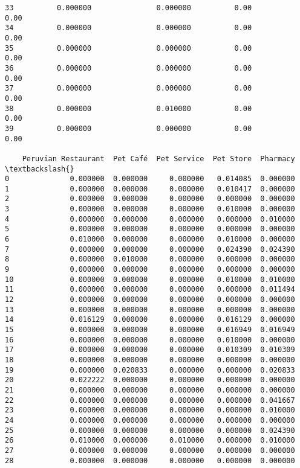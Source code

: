 \documentclass[11pt]{article}
\begin{document}
\begin{tcolorbox}[breakable, size=fbox, boxrule=.5pt, pad at break*=1mm, opacityfill=0]
\begin{Verbatim}[commandchars=\\\{\}]
33          0.000000               0.000000          0.00                0.00
34          0.000000               0.000000          0.00                0.00
35          0.000000               0.000000          0.00                0.00
36          0.000000               0.000000          0.00                0.00
37          0.000000               0.000000          0.00                0.00
38          0.000000               0.010000          0.00                0.00
39          0.000000               0.000000          0.00                0.00

    Peruvian Restaurant  Pet Café  Pet Service  Pet Store  Pharmacy  \textbackslash{}
0              0.000000  0.000000     0.000000   0.014085  0.000000
1              0.000000  0.000000     0.000000   0.010417  0.000000
2              0.000000  0.000000     0.000000   0.000000  0.000000
3              0.000000  0.000000     0.000000   0.010000  0.000000
4              0.000000  0.000000     0.000000   0.000000  0.010000
5              0.000000  0.000000     0.000000   0.000000  0.000000
6              0.010000  0.000000     0.000000   0.010000  0.000000
7              0.000000  0.000000     0.000000   0.024390  0.024390
8              0.000000  0.010000     0.000000   0.000000  0.000000
9              0.000000  0.000000     0.000000   0.000000  0.000000
10             0.000000  0.000000     0.000000   0.010000  0.010000
11             0.000000  0.000000     0.000000   0.000000  0.011494
12             0.000000  0.000000     0.000000   0.000000  0.000000
13             0.000000  0.000000     0.000000   0.000000  0.000000
14             0.016129  0.000000     0.000000   0.016129  0.000000
15             0.000000  0.000000     0.000000   0.016949  0.016949
16             0.000000  0.000000     0.000000   0.010000  0.000000
17             0.000000  0.000000     0.000000   0.010309  0.010309
18             0.000000  0.000000     0.000000   0.000000  0.000000
19             0.000000  0.020833     0.000000   0.000000  0.020833
20             0.022222  0.000000     0.000000   0.000000  0.000000
21             0.000000  0.000000     0.000000   0.000000  0.000000
22             0.000000  0.000000     0.000000   0.000000  0.041667
23             0.000000  0.000000     0.000000   0.000000  0.010000
24             0.000000  0.000000     0.000000   0.000000  0.000000
25             0.000000  0.000000     0.000000   0.000000  0.024390
26             0.010000  0.000000     0.010000   0.000000  0.010000
27             0.000000  0.000000     0.000000   0.000000  0.000000
28             0.000000  0.000000     0.000000   0.000000  0.000000

\end{Verbatim}
\end{tcolorbox}
\end{document}
